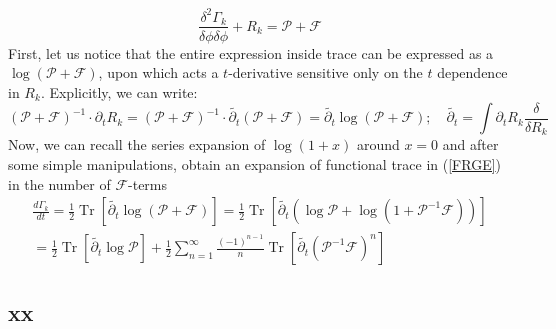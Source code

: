\documentclass[11pt, a4paper]{article}
\begin{document}
\begin{equation}
    \frac{\delta^2 \Gamma_k}{\delta \phi \delta \phi} + R_k = \mathcal{P} + \mathcal{F}
\end{equation}
First, let us notice that the entire expression inside trace can be expressed as a $\log{(\mathcal{P}+\mathcal{F})}$, upon which acts
a $t$-derivative sensitive only on the $t$ dependence in $R_k$. Explicitly, we can write:
\begin{equation}
    \left(\mathcal{P} + \mathcal{F}\right)^{-1} \cdot \partial_t R_k = \left(\mathcal{P} + \mathcal{F}\right)^{-1} \cdot \widetilde{\partial_t} \left(\mathcal{P}+\mathcal{F}\right) = \widetilde{\partial_t} \log{\left(\mathcal{P}+\mathcal{F}\right)}; \quad \widetilde{\partial_t} = \int \partial_t R_k \frac{\delta}{\delta R_k}
\end{equation}
Now, we can recall the series expansion of $\log{(1+x)}$ around $x=0$ and after some simple manipulations, obtain an expansion of functional trace in (\ref{FRGE}) in
the number of $\mathcal{F}$-terms
\begin{gather}
    \frac{d \Gamma_k}{dt} = \frac{1}{2} \operatorname{Tr} \left[ \widetilde{\partial_t} \log{\left(\mathcal{P}+\mathcal{F}\right)} \right] = \frac{1}{2} \operatorname{Tr} \left[ \widetilde{\partial_t} \left(\log{\mathcal{P}} + \log{(1+\mathcal{P}^{-1}\mathcal{F})}\right) \right] \\ =  \frac{1}{2} \operatorname{Tr} \left[ \widetilde{\partial_t} \log{\mathcal{P}} \right] + \frac{1}{2} \sum_{n=1}^{\infty} \frac{(-1)^{n-1}}{n} \operatorname{Tr}\left[\widetilde{\partial_t}\left(\mathcal{P}^{-1}\mathcal{F}\right)^n\right]
\end{gather}

\subsection{xx}
\end{document}
